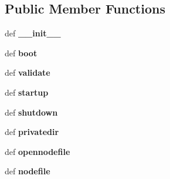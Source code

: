 \subsection*{Public Member Functions}
\begin{DoxyCompactItemize}
\item 
\hypertarget{classcore_1_1bsd_1_1vnode_1_1_jail_node_af21db0f27e1288a3298354330453411a}{def {\bfseries \+\_\+\+\_\+init\+\_\+\+\_\+}}\label{classcore_1_1bsd_1_1vnode_1_1_jail_node_af21db0f27e1288a3298354330453411a}

\item 
\hypertarget{classcore_1_1bsd_1_1vnode_1_1_jail_node_ae7df233bc74edd2a3e2bee1f025fada4}{def {\bfseries boot}}\label{classcore_1_1bsd_1_1vnode_1_1_jail_node_ae7df233bc74edd2a3e2bee1f025fada4}

\item 
\hypertarget{classcore_1_1bsd_1_1vnode_1_1_jail_node_aa330a57fe098868ebe8781155205c0ba}{def {\bfseries validate}}\label{classcore_1_1bsd_1_1vnode_1_1_jail_node_aa330a57fe098868ebe8781155205c0ba}

\item 
\hypertarget{classcore_1_1bsd_1_1vnode_1_1_jail_node_ae7508e46655a53019a4df8cc844586c8}{def {\bfseries startup}}\label{classcore_1_1bsd_1_1vnode_1_1_jail_node_ae7508e46655a53019a4df8cc844586c8}

\item 
\hypertarget{classcore_1_1bsd_1_1vnode_1_1_jail_node_ac68c5fb28144774ac9c7a63d4fc0a043}{def {\bfseries shutdown}}\label{classcore_1_1bsd_1_1vnode_1_1_jail_node_ac68c5fb28144774ac9c7a63d4fc0a043}

\item 
\hypertarget{classcore_1_1bsd_1_1vnode_1_1_jail_node_a812c7ef8928da01de2a9185870178520}{def {\bfseries privatedir}}\label{classcore_1_1bsd_1_1vnode_1_1_jail_node_a812c7ef8928da01de2a9185870178520}

\item 
\hypertarget{classcore_1_1bsd_1_1vnode_1_1_jail_node_a51eb26e721fc74924cde74ebf320216b}{def {\bfseries opennodefile}}\label{classcore_1_1bsd_1_1vnode_1_1_jail_node_a51eb26e721fc74924cde74ebf320216b}

\item 
\hypertarget{classcore_1_1bsd_1_1vnode_1_1_jail_node_abc5e3d76c5503e9ed8d49b970e4ab771}{def {\bfseries nodefile}}\label{classcore_1_1bsd_1_1vnode_1_1_jail_node_abc5e3d76c5503e9ed8d49b970e4ab771}

\end{DoxyCompactItemize}
